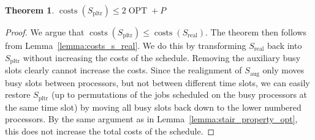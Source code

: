 \documentclass[a4paper]{article}
\DeclareMathOperator{\costs}{costs}
\DeclareMathOperator{\OPT}{OPT}
\DeclareMathOperator{\pltr}{pltr}
\DeclareMathOperator{\aug}{aug}
\DeclareMathOperator{\real}{real}
\newtheorem{theorem}{Theorem}
\begin{document}
\begin{theorem}\label{theorem:approximation}
  $\costs(S_{\pltr}) \leq 2 \OPT + P$
\end{theorem}
\begin{proof}
  We argue that $\costs(S_{\pltr}) \leq \costs(S_{\real})$.
  The theorem then follows from Lemma~\ref{lemma:costs_s_real}.
  We do this by transforming $S_{\real}$ back into $S_{\pltr}$ without increasing the costs of the schedule.
  Removing the auxiliary busy slots clearly cannot increase the costs.
  Since the realignment of $S_{\aug}$ only moves busy slots between processors, but not between different time slots, we can easily restore $S_{\pltr}$ (up to permutations of the jobs scheduled on the busy processors at the same time slot) by moving all busy slots back down to the lower numbered processors.
  By the same argument as in Lemma~\ref{lemma:stair_property_opt}, this does not increase the total costs of the schedule.
\end{proof}
\end{document}
